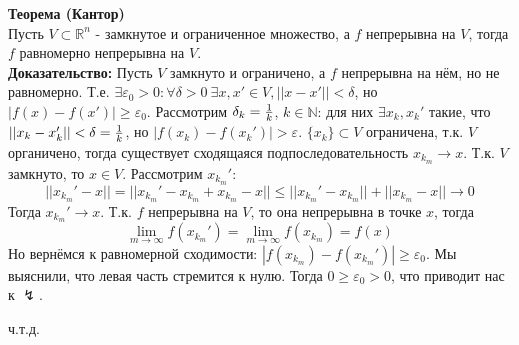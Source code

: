 \documentclass[book, 11pt]{report}
\begin{document}
        \par{\textbf{Теорема (Кантор)}\\
        Пусть $V\subset\mathbb{R}^n$ - замкнутое и ограниченное множество, а $f$ непрерывна на $V$, тогда $f$ равномерно непрерывна на $V$.\\
        \textbf{Доказательство: }Пусть $V$ замкнуто и ограничено, а $f$ непрерывна на нём, но не равномерно. Т.е. $\exists\varepsilon_0>0:\forall\delta>0 \ \exists x,x'\in V, ||x-x'||<\delta$, но $|f(x)-f(x')|\geq\varepsilon_0$. Рассмотрим $\delta_k={1\over k}$, $k\in\mathbb{N}$: для них $\exists x_k,x_k'$ такие, что $||x_k-x_k'||<\delta={1\over k}$, но $|f(x_k)-f(x_k')|>\varepsilon$. $\{x_k\}\subset V$ ограничена, т.к. $V$ органичено, тогда существует сходящаяся подпоследовательность $x_{k_m}\to x$. Т.к. $V$ замкнуто, то $x\in V$. Рассмотрим $x_{k_m}'$:
        \begin{equation*}
            ||x_{k_m}'-x||=||x_{k_m}'-x_{k_m}+x_{k_m}-x||\leq||x_{k_m}'-x_{k_m}||+||x_{k_m}-x||\to0
        \end{equation*}
        Тогда $x_{k_m}'\to x$. Т.к. $f$ непрерывна на $V$, то она непрерывна в точке $x$, тогда
        \begin{equation*}
        \displaystyle\lim_{m\to\infty}f(x_{k_m}')=\lim_{m\to\infty}f(x_{k_m})=f(x)
        \end{equation*}
        Но вернёмся к равномерной сходимости: $|f(x_{k_m})-f(x_{k_m}')|\geq\varepsilon_0$. Мы выяснили, что левая часть стремится к нулю. Тогда $0\geq\varepsilon_0>0$, что приводит нас к $\lightning$.
        }
        \par{{\raggedleft ч.т.д.\par}}
        \vspace{0.6cm}
\end{document}
